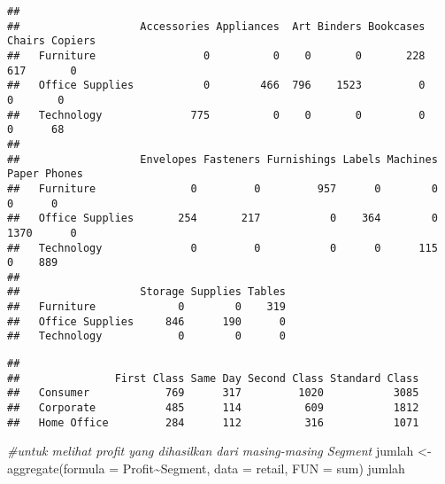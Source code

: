 \documentclass[
]{article}
\newenvironment{Shaded}{\begin{snugshade}}{\end{snugshade}}
\newcommand{\AttributeTok}[1]{\textcolor[rgb]{0.77,0.63,0.00}{#1}}
\newcommand{\CommentTok}[1]{\textcolor[rgb]{0.56,0.35,0.01}{\textit{#1}}}
\newcommand{\FunctionTok}[1]{\textcolor[rgb]{0.00,0.00,0.00}{#1}}
\newcommand{\NormalTok}[1]{#1}
\newcommand{\OtherTok}[1]{\textcolor[rgb]{0.56,0.35,0.01}{#1}}
\newcommand{\SpecialCharTok}[1]{\textcolor[rgb]{0.00,0.00,0.00}{#1}}
\begin{document}
\begin{Shaded}
\end{Shaded}

\begin{verbatim}
##                  
##                   Accessories Appliances  Art Binders Bookcases Chairs Copiers
##   Furniture                 0          0    0       0       228    617       0
##   Office Supplies           0        466  796    1523         0      0       0
##   Technology              775          0    0       0         0      0      68
##                  
##                   Envelopes Fasteners Furnishings Labels Machines Paper Phones
##   Furniture               0         0         957      0        0     0      0
##   Office Supplies       254       217           0    364        0  1370      0
##   Technology              0         0           0      0      115     0    889
##                  
##                   Storage Supplies Tables
##   Furniture             0        0    319
##   Office Supplies     846      190      0
##   Technology            0        0      0
\end{verbatim}

\begin{Shaded}
\end{Shaded}

\begin{verbatim}
##              
##               First Class Same Day Second Class Standard Class
##   Consumer            769      317         1020           3085
##   Corporate           485      114          609           1812
##   Home Office         284      112          316           1071
\end{verbatim}

\begin{Shaded}
\begin{Highlighting}[]
\CommentTok{\#untuk melihat profit yang dihasilkan dari masing{-}masing Segment}
\NormalTok{jumlah }\OtherTok{\textless{}{-}} \FunctionTok{aggregate}\NormalTok{(}\AttributeTok{formula =}\NormalTok{ Profit}\SpecialCharTok{\textasciitilde{}}\NormalTok{Segment, }\AttributeTok{data =}\NormalTok{ retail, }\AttributeTok{FUN =}\NormalTok{ sum)}
\NormalTok{jumlah}
\end{Highlighting}
\end{Shaded}
\end{document}
